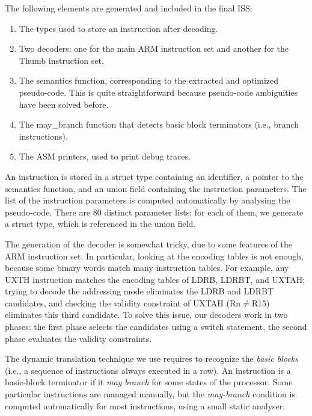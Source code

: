 \documentclass[conference]{ieeeconf}
\begin{document}
The following elements are generated and included in the final ISS:
\begin{enumerate}
\item The types used to store an instruction after decoding.
\item Two decoders: one for the main ARM instruction set and another for the
  Thumb instruction set.
\item The semantics function, corresponding to the extracted and optimized
  pseudo-code. This is quite straightforward because pseudo-code ambiguities
  have been solved before.
\item The {\stt may\_branch} function that detects basic block terminators
  (i.e., branch instructions).
\item The ASM printers, used to print debug traces.
\end{enumerate}

An instruction is stored in a {\stt struct} type containing an identifier, a
pointer to the semantics function, and an {\stt union} field containing the
instruction parameters. The list of the instruction parameters is computed
automatically by analysing the pseudo-code. There are 80 distinct parameter
lists; for each of them, we generate a {\stt struct} type, which is referenced
in the {\stt union} field.

The generation of the decoder is somewhat tricky, due to some features of the
ARM instruction set. In particular, looking at the encoding tables is not
enough, because some binary words match many instruction tables. For example, any
{\stt UXTH} instruction matches the encoding tables of {\stt LDRB}, {\stt
  LDRBT}, and {\stt UXTAH}; trying to decode the addressing mode eliminates the
{\stt LDRB} and {\stt LDRBT} candidates, and checking the validity constraint of
{\stt UXTAH} ({\stt Rn$\ne$R15}) eliminates this third candidate.  To solve this
issue, our decoders work in two phases: the first phase selects the candidates
using a {\stt switch} statement, the second phase evaluates the validity
constraints.

\label{s:maybranch}
The dynamic translation technique we use requires to recognize the {\em basic
  blocks} (i.e., a sequence of instructions always executed in a row). An
instruction is a basic-block terminator if it {\em may branch} for some states
of the processor. Some particular instructions are managed manually, but the
{\em may-branch} condition is computed automatically for most instructions, using a
small static analyser.
\end{document}
